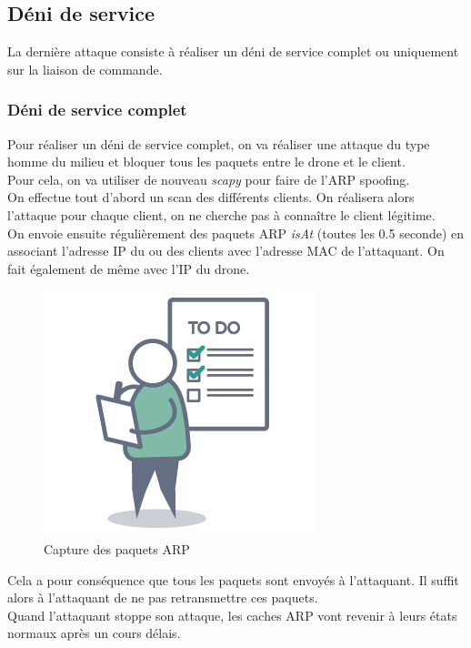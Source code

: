 \subsection{Déni de service}
La dernière attaque consiste à réaliser un déni de service complet ou uniquement sur la liaison de commande.

\subsubsection{Déni de service complet}
Pour réaliser un déni de service complet, on va réaliser une attaque du type homme du milieu et bloquer tous les paquets entre le drone et le client.\\
Pour cela, on va utiliser de nouveau \textit{scapy} pour faire de l'ARP spoofing.\\
On effectue tout d'abord un scan des différents clients. On réalisera alors l'attaque pour chaque client, on ne cherche pas à connaître le client légitime.\\
On envoie ensuite régulièrement des paquets ARP \textit{isAt} (toutes les 0.5 seconde) en associant l'adresse IP du ou des clients avec l'adresse MAC de l'attaquant. On fait également de même avec l'IP du drone.

\begin{figure}[H]
  \centering
  \includegraphics[scale=0.35]{images/todo.png}
  \caption{Capture des paquets ARP}
\end{figure}

Cela a pour conséquence que tous les paquets sont envoyés à l'attaquant. Il suffit alors à l'attaquant de ne pas retransmettre ces paquets.\\
Quand l'attaquant stoppe son attaque, les caches ARP vont revenir à leurs états normaux après un cours délais.

